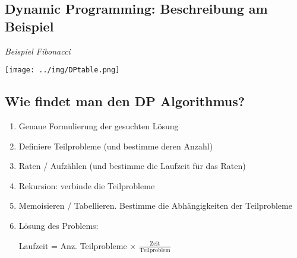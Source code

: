 \documentclass[german]{latex4ei/latex4ei_sheet}
\begin{document}
\begin{sectionbox}
\subsection{Dynamic Programming: Beschreibung am Beispiel}\smallskip

\textit{Beispiel Fibonacci}\par
\begin{center}
    \texttt{[image: ../img/DPtable.png]}
\end{center}\smallskip

\end{sectionbox}

\begin{sectionbox}
\subsection{Wie findet man den DP Algorithmus?}\smallskip
\begin{enumerate}
    \item Genaue Formulierung der gesuchten Lösung
    \item Definiere Teilprobleme (und bestimme deren Anzahl)
    \item Raten / Aufzählen (und bestimme die Laufzeit für das Raten)
    \item Rekursion: verbinde die Teilprobleme
    \item Memoisieren / Tabellieren. Bestimme die Abhängigkeiten der Teilprobleme
    \item Lösung des Problems: \par Laufzeit = Anz. Teilprobleme $\times$ $\frac{\text{Zeit}}{\text{Teilproblem}}$
\end{enumerate}

\end{sectionbox}
\end{document}
